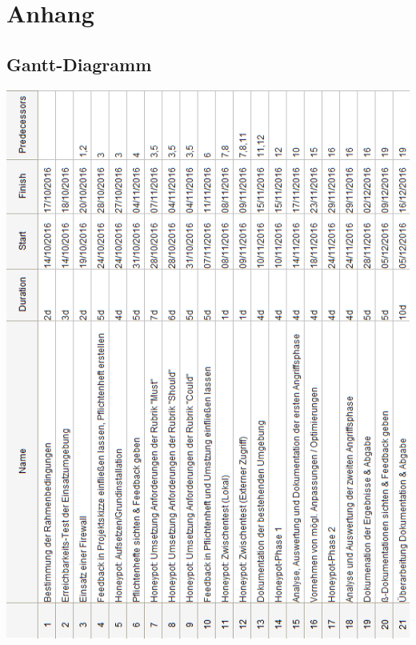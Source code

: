 \appendix

\chapter{Anhang}
\label{ch:Anhang}


\section*{Gantt-Diagramm}
\label{app:Gantt-Diagramm}

\begin{center}
\includegraphics[scale=0.83]{img/gantt_tasks.png}
\end{center}

\newpage

